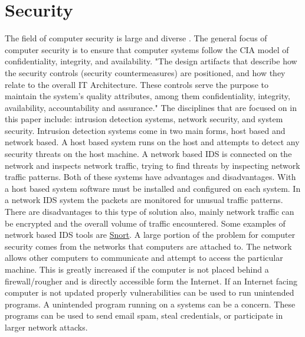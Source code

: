 \documentclass[12pt]{article}
\begin{document}

\section{Security}
The field of computer security is large and diverse \cite{ComputerSecurity}. The general focus of computer security is to ensure that computer systems follow the CIA model of confidentiality, integrity, and availability. "The design artifacts that describe how the security controls (security countermeasures) are positioned, and how they relate to the overall IT Architecture. These controls serve the purpose to maintain the system's quality attributes, among them confidentiality, integrity, availability, accountability and assurance." \cite{it_security_architecture} The disciplines that are focused on in this paper include: intrusion detection systems, network security, and system security.
Intrusion detection systems come in two main forms, host based and network based. A host based system runs on the host and attempts to detect any security threats on the host machine. A network based IDS is connected on the network and inspects network traffic, trying to find threats by inspecting network traffic patterns. Both of these systems have advantages and disadvantages. With a host based system software must be installed and configured on each system. In a network IDS system the packets are monitored for unusual traffic patterns. There are disadvantages to this type of solution also, mainly network traffic can be encrypted and the overall volume of traffic encountered. Some examples of network based IDS tools are \href{https://www.snort.org/}{Snort}.
A large portion of the problem for computer security comes from the networks that computers are attached to. The network allows other computers to communicate and attempt to access the particular machine. This is greatly increased if the computer is not placed behind a firewall/rougher and is directly accessible form the Internet. If an Internet facing computer is not updated properly vulnerabilities can be used to run unintended programs.
A unintended program running on a systems can be a concern. These programs can be used to send email spam, steal credentials, or participate in larger network attacks.

\end{document}
